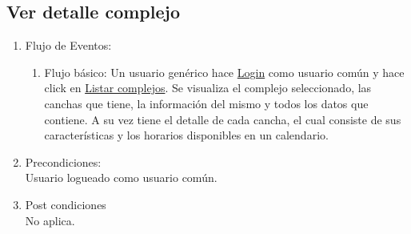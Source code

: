\documentclass[a4paper,11pt]{article}
\begin{document}
\subsection{Ver detalle complejo}
\begin{enumerate}


    \begin{enumerate}
    \item Descripción breve: \\
        Se muestra en detalle las características de un complejo.
    \item Actores \\
        Administrador.
    \item Disparadores: \\
        Click en el botón \underline{Ver detalle} dentro de la
        página que lista los complejos del sistema.
    \end{enumerate}

    \item Flujo de Eventos: 

    \begin{enumerate}

        \item Flujo básico:
            Un usuario genérico hace \underline{Login} como usuario común y
            hace click en \underline{Listar complejos}. Se visualiza el
            complejo seleccionado, las canchas que tiene, la información del
            mismo y todos los datos que contiene. A su vez tiene el detalle de
            cada cancha, el cual consiste de sus características y los horarios
            disponibles en un calendario.


    \end{enumerate}

    \item Precondiciones: \\
        Usuario logueado como usuario común.

    \item Post condiciones \\
        No aplica.

\end{enumerate}

\end{document}
